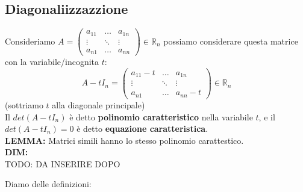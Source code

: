 \subsection{Diagonaliizzazzione}
Consideriamo $A = \begin{pmatrix}
a_{11} & \dots & a_{1n}\\
\vdots & \ddots & \vdots \\
a_{n1} & \dots & a_{nn}
\end{pmatrix} \in \mathbb{R}_n$
possiamo considerare questa matrice con la variabile/incognita $t$:
$$A-tI_n = \begin{pmatrix}
a_{11}-t & \dots & a_{1n}\\
\vdots & \ddots & \vdots \\
a_{n1} & \dots & a_{nn}-t
\end{pmatrix} \in \mathbb{R}_n$$
(sottriamo $t$ alla diagonale principale)\\
Il $det(A-tI_n)$ è detto \textbf{polinomio caratteristico} nella variabile $t$, e il $det(A-tI_n) = 0$ è detto \textbf{equazione caratteristica}.\\

\textbf{LEMMA:} Matrici simili hanno lo stesso polinomio carattestico.\\
\textbf{DIM:}\\
TODO: DA INSERIRE DOPO

Diamo delle definizioni:

